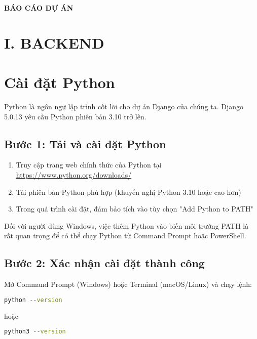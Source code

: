 \documentclass[12pt,a4paper]{article}
\date{}
\begin{document}
\begin{center}
    \Huge\textbf{BÁO CÁO DỰ ÁN}
\end{center}

\section*{I. BACKEND}

\section{Cài đặt Python}

Python là ngôn ngữ lập trình cốt lõi cho dự án Django của chúng ta. Django 5.0.13 yêu cầu Python phiên bản 3.10 trở lên.

\subsection{Bước 1: Tải và cài đặt Python}

\begin{enumerate}
    \item Truy cập trang web chính thức của Python tại \url{https://www.python.org/downloads/}
    \item Tải phiên bản Python phù hợp (khuyến nghị Python 3.10 hoặc cao hơn)
    \item Trong quá trình cài đặt, đảm bảo tích vào tùy chọn "Add Python to PATH"
\end{enumerate}

\begin{tcolorbox}[colback=yellow!10, colframe=yellow!50!black, title=Lưu ý quan trọng]
Đối với người dùng Windows, việc thêm Python vào biến môi trường PATH là rất quan trọng để có thể chạy Python từ Command Prompt hoặc PowerShell.
\end{tcolorbox}

\subsection{Bước 2: Xác nhận cài đặt thành công}

Mở Command Prompt (Windows) hoặc Terminal (macOS/Linux) và chạy lệnh:

\begin{lstlisting}[language=bash]
python --version
\end{lstlisting}

hoặc

\begin{lstlisting}[language=bash]
python3 --version
\end{lstlisting}
\end{document}
